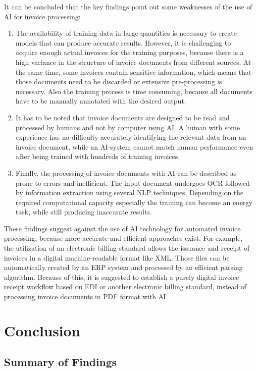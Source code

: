 It can be concluded that the key findings point out some weaknesses of the use of \acl{AI} for invoice processing:
\begin{enumerate}
    \item The availability of training data in large quantities is necessary to create models that can produce accurate results. However, it is challenging to acquire enough actual invoices for the training purposes, because there is a high variance in the structure of invoice documents from different sources. At the same time, some invoices contain sensitive information, which means that those documents need to be discarded or extensive pre-processing is necessary. Also the training process is time consuming, because all documents have to be manually annotated with the desired output.
    \item It has to be noted that invoice documents are designed to be read and processed by humans and not by computer using \ac{AI}. A human with some experience has no difficulty accurately identifying the relevant data from an invoice document, while an \ac{AI}-system cannot match human performance even after being trained with hundreds of training invoices.
    \item Finally, the processing of invoice documents with \ac{AI} can be described as prone to errors and inefficient. The input document undergoes \ac{OCR} followed by information extraction using several \ac{NLP} techniques. Depending on the required computational capacity especially the training can become an energy task, while still producing inaccurate results.
\end{enumerate}
These findings suggest against the use of \ac{AI} technology for automated invoice processing, because more accurate and efficient approaches exist. For example, the utilization of an electronic billing standard allows the issuance and receipt of invoices in a digital machine-readable format like XML. Those files can be automatically created by an \ac{ERP} system and processed by an efficient parsing algorithm.
Because of this, it is suggested to establish a purely digital invoice receipt workflow based on \ac{EDI} or another electronic billing standard, instead of processing invoice documents in PDF format with \ac{AI}.

\chapter{Conclusion}

\section{Summary of Findings}
